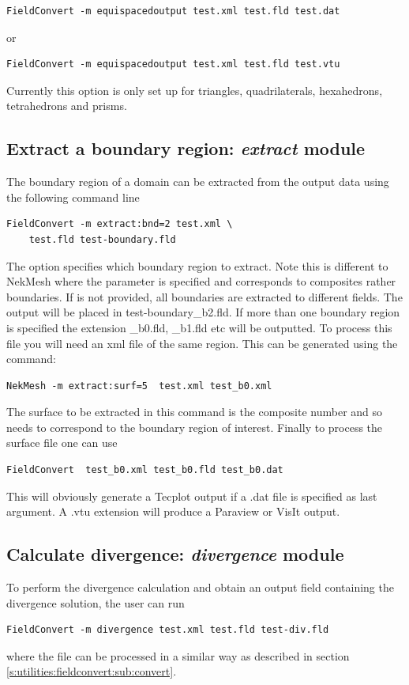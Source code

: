 \begin{lstlisting}[style=BashInputStyle]
FieldConvert -m equispacedoutput test.xml test.fld test.dat
\end{lstlisting}

or

\begin{lstlisting}[style=BashInputStyle]
FieldConvert -m equispacedoutput test.xml test.fld test.vtu
\end{lstlisting}


\begin{notebox}
Currently this option is only set up for triangles, quadrilaterals,
hexahedrons, tetrahedrons and prisms.
\end{notebox}

\subsection{Extract a boundary region: \textit{extract} module}
The boundary region of a domain can be extracted from the output
data using the following command line
%
\begin{lstlisting}[style=BashInputStyle]
FieldConvert -m extract:bnd=2 test.xml \
	test.fld test-boundary.fld
\end{lstlisting}
%
The option  specifies which boundary region to extract.
Note this is different to NekMesh where the parameter \inltt{surf}
is specified and corresponds to composites rather boundaries. If 
is not provided, all boundaries are extracted to different fields.
The output will be placed in test-boundary\_b2.fld.
If more than one boundary region is specified the extension \_b0.fld, \_b1.fld etc will be
outputted. To process this file you will need an xml file of the same region.
This can be generated using the command:
%
\begin{lstlisting}[style=BashInputStyle]
NekMesh -m extract:surf=5  test.xml test_b0.xml
\end{lstlisting}
%
The surface to be extracted in this command is the composite
number and so needs to correspond to the boundary region
of interest. Finally to process the surface file one can use
%
\begin{lstlisting}[style=BashInputStyle]
FieldConvert  test_b0.xml test_b0.fld test_b0.dat
\end{lstlisting}
%
This will obviously generate a Tecplot output if a .dat file
is specified as last argument. A .vtu extension will produce
a Paraview or VisIt output.
%
%
%
\subsection{Calculate divergence: \textit{divergence} module}
To perform the divergence calculation and obtain an output
field containing the divergence solution, the user can run
\begin{lstlisting}[style=BashInputStyle]
FieldConvert -m divergence test.xml test.fld test-div.fld
\end{lstlisting}
where the file  can be processed in a similar
way as described in section \ref{s:utilities:fieldconvert:sub:convert}.
%
%
%
